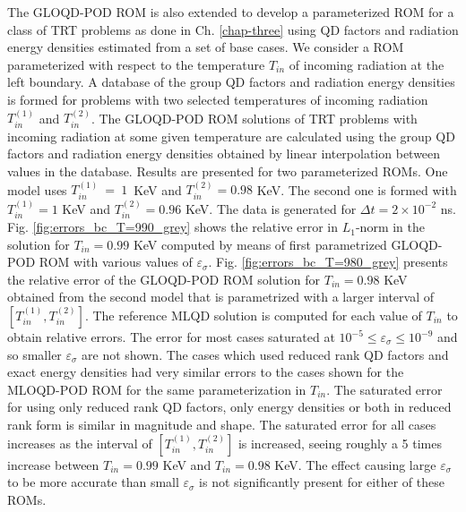 	\ind The GLOQD-POD ROM is also extended to develop a parameterized ROM for a class of TRT problems as done in Ch. \ref{chap-three} using QD factors and radiation energy densities estimated from a set of base cases. We consider a ROM parameterized with respect to the temperature $T_{in}$ of incoming radiation at the left boundary. A database of the group QD factors and radiation energy densities is formed for problems with two selected temperatures of incoming radiation  $T_{in}^{(1)}$ and $T_{in}^{(2)}$. The GLOQD-POD ROM solutions of TRT problems with incoming radiation at some given temperature are calculated using the group QD factors and radiation energy densities obtained by linear interpolation between values in the database. Results are presented for two parameterized ROMs. One model uses $T_{in}^{(1)}~=~1$~KeV and $T_{in}^{(2)}=0.98$ KeV. The second one is formed with  $T_{in}^{(1)}=1$ KeV and $T_{in}^{(2)}=0.96$ KeV. The data is generated for $\Delta t = 2\times10^{-2}$ ns. Fig. \ref{fig:errors_bc_T=990_grey} shows the relative error in $L_1$-norm in the solution for $T_{in}=0.99$ KeV computed by means of first parametrized GLOQD-POD ROM with various values of $\varepsilon_{\sigma}$. Fig. \ref{fig:errors_bc_T=980_grey} presents the relative error of the GLOQD-POD ROM solution  for $T_{in}= 0.98$ KeV obtained from the second model that is parametrized with a larger interval of  $[T_{in}^{(1)},T_{in}^{(2)}]$. The reference MLQD solution is computed for each value of $T_{in}$ to obtain relative errors. The error for most cases saturated at $10^{-5} \leq \varepsilon_\sigma \leq 10^{-9}$ and so smaller $\varepsilon_\sigma$ are not shown. The cases which used reduced rank QD factors and exact energy densities had very similar errors to the cases shown for the MLOQD-POD ROM for the same parameterization in $T_{in}$. The saturated error for using only reduced rank QD factors, only energy densities or both in reduced rank form is similar in magnitude and shape. The saturated error for all cases increases as the interval of  $[T_{in}^{(1)},T_{in}^{(2)}]$ is increased, seeing roughly a 5 times increase between $T_{in}= 0.99$ KeV and $T_{in}= 0.98$ KeV. The effect causing large $\varepsilon_\sigma$ to be more accurate than small $\varepsilon_\sigma$ is not significantly present for either of these ROMs.
	
